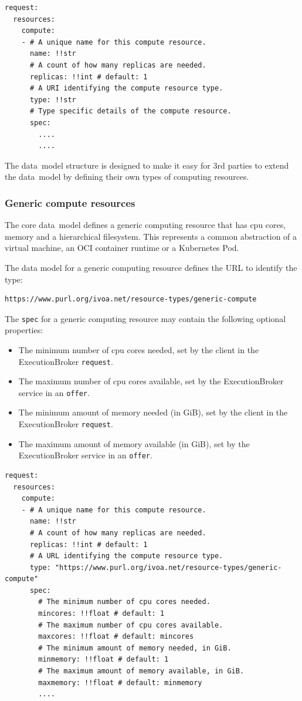 \documentclass[11pt,a4paper]{ivoa}
\newcommand{\datamodel} {data~model}
\newcommand{\execbrokerclass} {ExecutionBroker}
\newcommand{\kubernetes} {Kubernetes}
\newcommand{\codeword}[1] {\texttt{#1}}
\begin{document}
\begin{lstlisting}[]
request:
  resources:
    compute:
    - # A unique name for this compute resource.
      name: !!str
      # A count of how many replicas are needed.
      replicas: !!int # default: 1
      # A URI identifying the compute resource type.
      type: !!str
      # Type specific details of the compute resource.
      spec:
        ....
        ....
\end{lstlisting}

The \datamodel{} structure is designed to make it easy for 3rd parties
to extend the \datamodel{} by defining their own types of computing
resources.

\subsubsection{Generic compute resources}
\label{datamodel-generic-compute}

The core \datamodel{} defines a generic computing resource
that has cpu cores, memory and a hierarchical filesystem.
This represents a common abstraction of a virtual machine,
an OCI container runtime or a \kubernetes{} Pod.

The data model for a generic computing resource defines the URL to identify
the type:
\begin{lstlisting}[]
https://www.purl.org/ivoa.net/resource-types/generic-compute
\end{lstlisting}
\hfill \break
The \codeword{spec} for a generic computing resource may contain the following optional properties:
\begin{itemize}
    \item The minimum number of cpu cores needed, set by the client in the \execbrokerclass{} \codeword{request}.
    \item The maximum number of cpu cores available, set by the \execbrokerclass{} service in an \codeword{offer}.
    \item The minimum amount of memory needed (in GiB), set by the client in the \execbrokerclass{} \codeword{request}.
    \item The maximum amount of memory available (in GiB), set by the \execbrokerclass{} service in an \codeword{offer}.
\end{itemize}

\begin{lstlisting}[]
request:
  resources:
    compute:
    - # A unique name for this compute resource.
      name: !!str
      # A count of how many replicas are needed.
      replicas: !!int # default: 1
      # A URL identifying the compute resource type.
      type: "https://www.purl.org/ivoa.net/resource-types/generic-compute"
      spec:
        # The minimum number of cpu cores needed.
        mincores: !!float # default: 1
        # The maximum number of cpu cores available.
        maxcores: !!float # default: mincores
        # The minimum amount of memory needed, in GiB.
        minmemory: !!float # default: 1
        # The maximum amount of memory available, in GiB.
        maxmemory: !!float # default: minmemory
        ....
\end{lstlisting}
\end{document}
